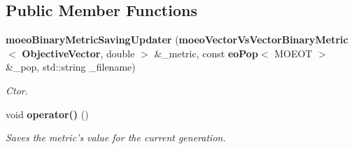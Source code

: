 \subsection*{Public Member Functions}
\begin{CompactItemize}
\item 
{\bf moeo\-Binary\-Metric\-Saving\-Updater} ({\bf moeo\-Vector\-Vs\-Vector\-Binary\-Metric}$<$ {\bf Objective\-Vector}, double $>$ \&\_\-metric, const {\bf eo\-Pop}$<$ MOEOT $>$ \&\_\-pop, std::string \_\-filename)
\begin{CompactList}\small\item\em Ctor. \item\end{CompactList}\item 
void {\bf operator()} ()\label{classmoeoBinaryMetricSavingUpdater_a4f0a9e86b4a39ef88e7f8e1c1d6d229}

\begin{CompactList}\small\item\em Saves the metric's value for the current generation. \item\end{CompactList}\end{CompactItemize}
